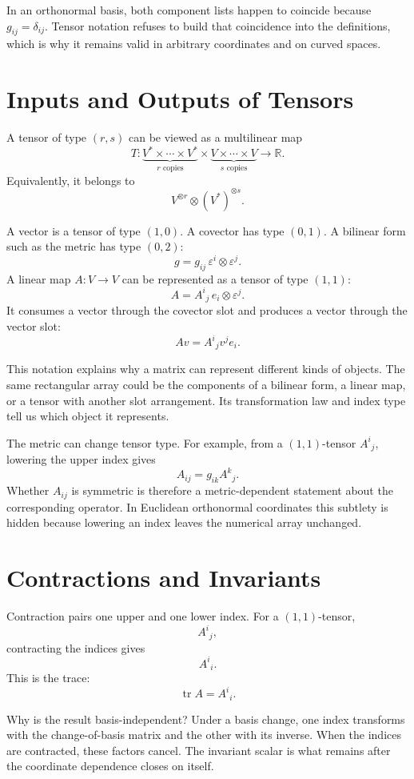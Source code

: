 In an orthonormal basis, both component lists happen to coincide because \(g_{ij}=\delta_{ij}\).  Tensor notation refuses to build that coincidence into the definitions, which is why it remains valid in arbitrary coordinates and on curved spaces.

\section{Inputs and Outputs of Tensors}

A tensor of type \((r,s)\) can be viewed as a multilinear map
\[
  T:
  \underbrace{V^*\times\cdots\times V^*}_{r\text{ copies}}
  \times
  \underbrace{V\times\cdots\times V}_{s\text{ copies}}
  \longrightarrow\mathbb R.
\]
Equivalently, it belongs to
\[
  V^{\otimes r}\otimes(V^*)^{\otimes s}.
\]

A vector is a tensor of type \((1,0)\).  A covector has type \((0,1)\).  A bilinear form such as the metric has type \((0,2)\):
\[
  g=g_{ij}\,\varepsilon^i\otimes\varepsilon^j.
\]
A linear map \(A:V\to V\) can be represented as a tensor of type \((1,1)\):
\[
  A=A^i{}_j\,e_i\otimes\varepsilon^j.
\]
It consumes a vector through the covector slot and produces a vector through the vector slot:
\[
  Av=A^i{}_jv^j e_i.
\]

This notation explains why a matrix can represent different kinds of objects.  The same rectangular array could be the components of a bilinear form, a linear map, or a tensor with another slot arrangement.  Its transformation law and index type tell us which object it represents.

The metric can change tensor type.  For example, from a \((1,1)\)-tensor \(A^i{}_j\), lowering the upper index gives
\[
  A_{ij}=g_{ik}A^k{}_j.
\]
Whether \(A_{ij}\) is symmetric is therefore a metric-dependent statement about the corresponding operator.  In Euclidean orthonormal coordinates this subtlety is hidden because lowering an index leaves the numerical array unchanged.

\section{Contractions and Invariants}

Contraction pairs one upper and one lower index.  For a \((1,1)\)-tensor,
\[
  A^i{}_j,
\]
contracting the indices gives
\[
  A^i{}_i.
\]
This is the trace:
\[
  \operatorname{tr}A=A^i{}_i.
\]

Why is the result basis-independent?  Under a basis change, one index transforms with the change-of-basis matrix and the other with its inverse.  When the indices are contracted, these factors cancel.  The invariant scalar is what remains after the coordinate dependence closes on itself.

